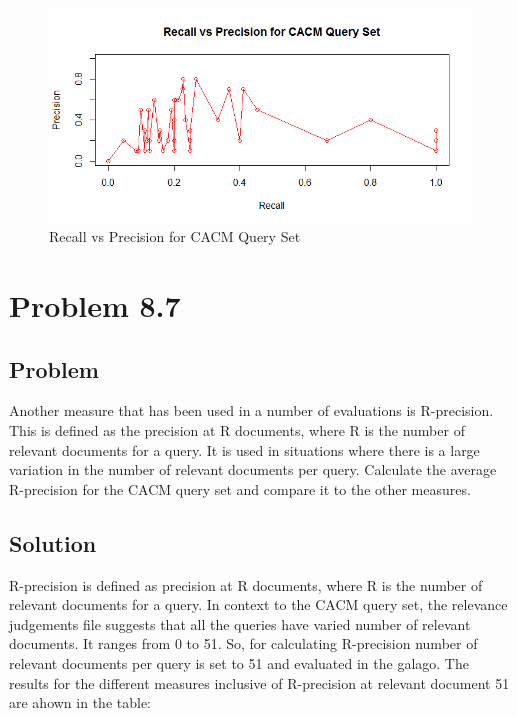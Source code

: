 \documentclass[12pt]{report}
\begin{document}
\begin{figure}[ht]
  \centering
  \includegraphics[width=1\textwidth]{Problem8_5/RecallvsPrecision.png}
  \caption{Recall vs Precision for CACM Query Set}
  \label{fig:1}
\end{figure}

\chapter{Problem 8.7}
\section{Problem}
Another measure that has been used in a number of evaluations is R-precision. This is defined as the precision at R documents, where R is the number of relevant documents for a query. It is used in situations where there is a large variation in the number of relevant documents per query. Calculate the average R-precision for the CACM query set and compare it to the other measures.
\section{Solution}
R-precision is defined as precision at R documents, where R is the number of relevant documents for a query. In context to the CACM query set, the relevance judgements file suggests that all the queries have varied number of relevant documents. It ranges from 0 to 51. So, for calculating R-precision number of relevant documents per query is set to 51 and evaluated in the galago.
The results for the different measures inclusive of R-precision at relevant document 51 are ahown in the table:
\end{document}
